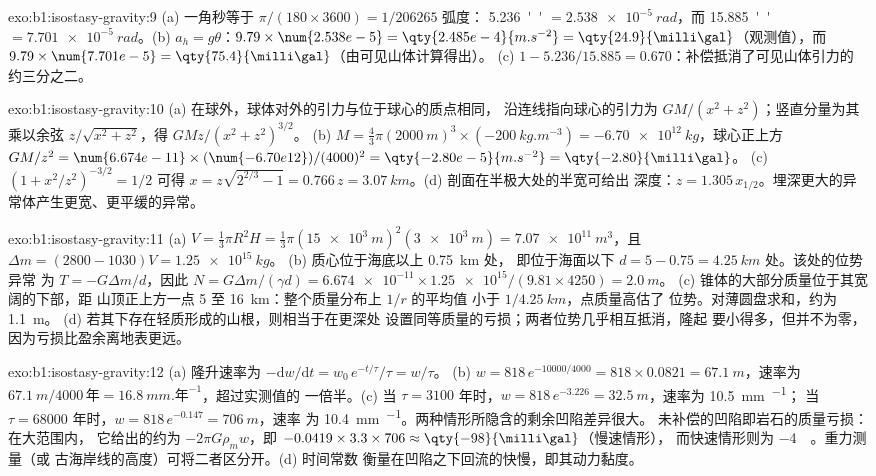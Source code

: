 \begin{solution}{exo:b1:isostasy-gravity:9}
(a) 一角秒等于 $\pi/(180\times3600) = 1/\num{206265}$ 弧度：
\qty{5.236}{''} $= \qty{2.538e-5}{rad}$，而 \qty{15.885}{''} $=
\qty{7.701e-5}{rad}$。(b) $a_h = g\theta$：$9.79\times\num{2.538e-5} =
\qty{2.485e-4}{m.s^{-2}} = \qty{24.9}{\milli\gal}$（观测值），而
$9.79\times\num{7.701e-5} = \qty{75.4}{\milli\gal}$（由可见山体计算得出）。
(c) $1 - 5.236/15.885 = 0.670$：补偿抵消了可见山体引力的
约三分之二。
\end{solution}

\begin{solution}{exo:b1:isostasy-gravity:10}
(a) 在球外，球体对外的引力与位于球心的质点相同，
沿连线指向球心的引力为 $GM/(x^2 + z^2)$；竖直分量为其
乘以余弦 $z/\sqrt{x^2 + z^2}$，得 $GMz/(x^2 + z^2)^{3/2}$。
(b) $M = \tfrac43\pi(\qty{2000}{m})^3\times(\qty{-200}{kg.m^{-3}}) =
\qty{-6.70e12}{kg}$，球心正上方 $GM/z^2 = \num{6.674e-11}\times
(\num{-6.70e12})/(4000)^2 = \qty{-2.80e-5}{m.s^{-2}} = \qty{-2.80}{\milli\gal}$。
(c) $(1 + x^2/z^2)^{-3/2} = 1/2$ 可得 $x = z\sqrt{2^{2/3} - 1} = 0.766\,z =
\qty{3.07}{km}$。(d) 剖面在半极大处的半宽可给出
深度：$z = 1.305\,x_{1/2}$。埋深更大的异常体产生更宽、更平缓的异常。
\end{solution}

\begin{solution}{exo:b1:isostasy-gravity:11}
(a) $V = \tfrac13\pi R^2 H = \tfrac13\pi(\qty{15e3}{m})^2(\qty{3e3}{m}) =
\qty{7.07e11}{m^3}$，且 $\Delta m = (2800 - 1030)V = \qty{1.25e15}{kg}$。
(b) 质心位于海底以上 \qty{0.75}{km} 处，
即位于海面以下 $d = 5 - 0.75 = \qty{4.25}{km}$ 处。该处的位势异常
为 $T = -G\Delta m/d$，因此 $N = G\Delta m/(\gamma d) =
\num{6.674e-11}\times\num{1.25e15}/(9.81\times4250) = \qty{2.0}{m}$。
(c) 锥体的大部分质量位于其宽阔的下部，距
山顶正上方一点 5 至 \qty{16}{km}：整个质量分布上 $1/r$ 的平均值
小于 $1/\qty{4.25}{km}$，点质量高估了
位势。对薄圆盘求和，约为 \qty{1.1}{m}。
(d) 若其下存在轻质形成的山根，则相当于在更深处
设置同等质量的亏损；两者位势几乎相互抵消，隆起
要小得多，但并不为零，因为亏损比盈余离地表更远。
\end{solution}

\begin{solution}{exo:b1:isostasy-gravity:12}
(a) 隆升速率为 $-\mathrm dw/\mathrm dt = w_0\,e^{-t/\tau}/\tau = w/\tau$。
(b) $w = 818\,e^{-10000/4000} = 818\times0.0821 = \qty{67.1}{m}$，速率为
$\qty{67.1}{m}/\num{4000}\,\unit{\text{年}} = \qty{16.8}{mm.\text{年}^{-1}}$，超过实测值的
一倍半。(c) 当 $\tau = 3100$ 年时，$w =
818\,e^{-3.226} = \qty{32.5}{m}$，速率为 \qty{10.5}{mm.^{-1}}；
当 $\tau = \num{68000}$ 年时，$w = 818\,e^{-0.147} = \qty{706}{m}$，速率
为 \qty{10.4}{mm.^{-1}}。两种情形所隐含的剩余凹陷差异很大。
未补偿的凹陷即岩石的质量亏损：在大范围内，
它给出的约为 $-2\pi G\rho_m w$，即
$-0.0419\times3.3\times706 \approx \qty{-98}{\milli\gal}$（慢速情形），
而快速情形则为 \qty{-4}{\milli\gal}。重力测量（或
古海岸线的高度）可将二者区分开。(d) 时间常数
衡量在凹陷之下回流的快慢，即其动力黏度。
\end{solution}

